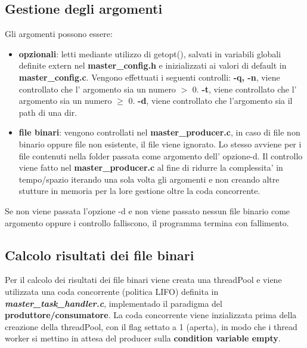 \documentclass{article}
\begin{document}
\subsection{Gestione degli argomenti}
Gli argomenti possono essere:
\begin{itemize}
    \itemsep 0em
    \item \textbf{opzionali}: letti mediante utilizzo di getopt(), salvati in variabili globali definite extern nel \textbf{master\_config.h} e inizializzati ai valori di default in \textbf{master\_config.c}. Vengono effettuati i seguenti controlli:
          \subitem \textbf{-q, -n}, viene controllato che l' argomento sia un numero $ > $ 0.
          \subitem \textbf{-t}, viene controllato che l' argomento sia un numero $ \ge $ 0.
          \subitem \textbf{-d}, viene controllato che l'argomento sia il path di una dir.
    \item \textbf{file binari}: vengono controllati nel \textbf{master\_producer.c}, in caso di file non binario oppure file non esistente, il file viene ignorato. Lo stesso avviene per i file contenuti nella folder passata come argomento dell' opzione-d. Il controllo viene fatto nel \textbf{master\_producer.c} al fine di ridurre la complessita' in tempo/spazio iterando una sola volta gli argomenti e non creando altre stutture in memoria per la lore gestione oltre la coda concorrente.
\end{itemize}

Se non viene passata l'opzione -d e non viene passato nessun file binario come argomento oppure i controllo falliscono, il programma termina con fallimento.

\subsection{Calcolo risultati dei file binari}
Per il calcolo dei risultati dei file binari viene creata una threadPool e viene utilizzata una coda concorrente (politica LIFO) definita in \textbf{\textit{master\_task\_handler.c}}, implementado il paradigma del \textbf{produttore/consumatore}.
La coda concorrente viene inzializzata prima della creazione della threadPool, con il flag settato a 1 (aperta), in modo che i thread worker si mettino in attesa del producer sulla \textbf{condition variable empty}.
\end{document}
